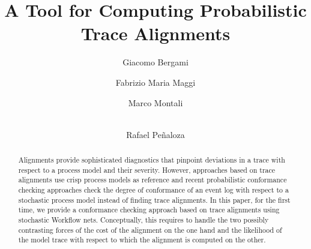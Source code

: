 \documentclass[runningheads]{llncs}
\begin{document}
%
\title{A Tool for Computing Probabilistic Trace Alignments}
%
%
\author{
	Giacomo Bergami \and
	Fabrizio Maria Maggi \and
	Marco Montali \and \\
	Rafael Pe\~naloza}

%

%
%
\maketitle              %
\linespread{0.98}
\vspace{-0.7cm}

\begin{abstract}
Alignments provide sophisticated diagnostics that pinpoint deviations in a trace with respect to a process model and their severity. However, approaches based on trace alignments use crisp process models as reference and recent probabilistic conformance checking approaches check the degree of conformance of an event log with respect to a stochastic process model instead of finding trace alignments. In this paper, for the first time, we provide a conformance checking approach based on trace alignments using stochastic Workflow nets. Conceptually, this requires to handle the two possibly contrasting forces of the cost of the alignment on the one hand and the likelihood of the model trace with respect to which the alignment is computed on the other.
\end{abstract}
\end{document}
